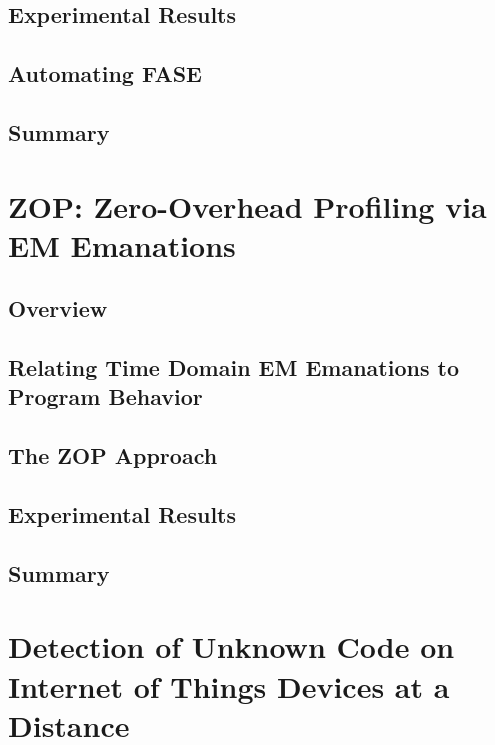 \documentclass[12pt]{gatech-thesis}
\begin{document}
\section{Experimental Results}
\label{sec:fase-results}


\section{Automating FASE}
\label{sec:fase-automated}


\section{Summary}


\chapter{ZOP: Zero-Overhead Profiling via EM Emanations}
\label{zop}
\label{sec:zop}

\section{Overview}


\section{Relating Time Domain EM Emanations to Program Behavior}
\label{zop-background}


\section{The ZOP Approach }
\label{sec:approach}


\section{Experimental Results}
\label{sec:evaluation}


\section{Summary}


\chapter{Detection of Unknown Code on Internet of Things Devices at a Distance}
\label{sec:malware_detect}
\end{document}
